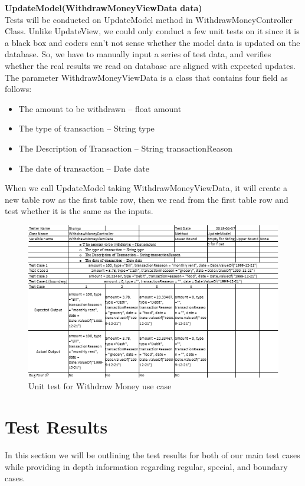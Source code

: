 \documentclass[12pt]{article}
\begin{document}
{\bf UpdateModel(WithdrawMoneyViewData data)}\\
Tests will be conducted on UpdateModel method in WithdrawMoneyController Class. Unlike UpdateView, we could only conduct a few unit tests on it since it is a black box and coders can’t not sense whether the model data is updated on the database. So, we have to manually input a series of test data, and verifies whether the real results we read on database are aligned with expected updates. The parameter WithdrawMoneyViewData is a class that contains four field as follows:
\begin{itemize}
  \item The amount to be withdrawn – float amount
  \item The type of transaction – String type
  \item The Description of Transaction – String transactionReason
  \item The date of transaction – Date date
\end{itemize}
When we call UpdateModel taking WithdrawMoneyViewData, it will create a new table row as the first table row, then we read from the first table row and test whether it is the same as the inputs.

\begin{figure}[H]
  \centering
  \includegraphics[]{unit_test_withdraw.png}
  \caption{Unit test for Withdraw Money use case}
\end{figure}

\section{Test Results}

In this section we will be outlining the test results for both of our main test cases while providing in depth information regarding regular, special, and boundary cases. 
\end{document}
